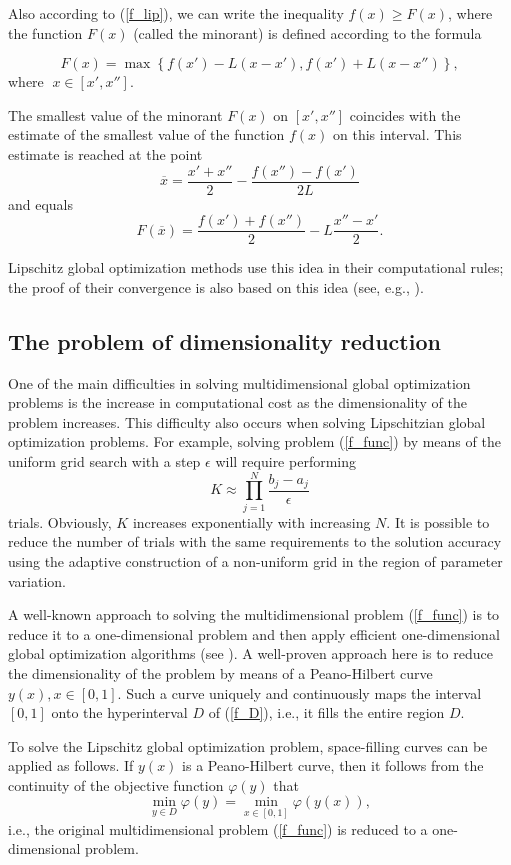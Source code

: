 \documentclass[iicol]{sn-jnl}
\theoremstyle{thmstyleone}%
\theoremstyle{thmstyletwo}%
\theoremstyle{thmstylethree}%
\begin{document}
Also according to (\ref{f_lip}), we can write the inequality $f(x) \geq F(x)$, where the function  $F(x)$ (called the minorant) is defined according to the formula

\[
F(x) = \max\left\{f(x') - L(x-x'),f(x') + L(x-x'')\right\},
\] 
where $\; x\in [x', x'']$.

The smallest value of the minorant $F(x)$ on $[x', x'']$ coincides with the estimate of the smallest value of the function $f(x)$ on this interval. This estimate is reached at the point
\[
\overline{x} = \frac{x'+x''}{2}-\frac{f(x'')-f(x')}{2L}
\] 
and equals
\[
F(\overline{x}) = \frac{f(x')+f(x'')}{2} -L \frac{x''-x'}{2}.
\]

Lipschitz global optimization methods use this idea in their computational rules; the proof of their convergence is also based on this idea (see, e.g.,
\citet{Jones2021,PaulaviciusZilinskas2014,Sergeyev2013,Evtushenko2013}).

\subsection{The problem of dimensionality reduction} 

One of the main difficulties in solving multidimensional global optimization problems is the increase in computational cost as the dimensionality of the problem increases. This difficulty also occurs when solving Lipschitzian global optimization problems. 
For example, solving problem (\ref{f_func}) by means of the uniform grid search with a step $\epsilon$ will require performing
\[
K \approx \prod_{j=1}^N{\frac{b_j-a_j}{\epsilon}}
\]
trials. Obviously, $K$ increases exponentially with increasing $N$. It is possible to reduce the number of trials with the same requirements to the solution accuracy using the adaptive construction of a non-uniform grid in the region of parameter variation. 

A well-known approach to solving the multidimensional problem (\ref{f_func}) is to reduce it to a one-dimensional problem and then apply efficient one-dimensional global optimization algorithms (see \citet{Strongin2000,Sergeyev2013}). A well-proven approach here is to reduce the dimensionality of the problem by means of a Peano-Hilbert curve $y(x), x \in [0, 1]$.  Such a curve uniquely and continuously maps the interval $[0, 1]$ onto the hyperinterval $D$ of (\ref{f_D}), i.e., it fills the entire region $D$.

To solve the Lipschitz global optimization problem, space-filling curves can be applied as follows. If $y(x)$ is a Peano-Hilbert curve, then it follows from the continuity of the objective function $\varphi(y)$ that
\[
\min_{y \in D } \varphi(y) = \min_{x \in [0,1] } \varphi(y(x)),
\]
i.e., the original multidimensional problem (\ref{f_func}) is reduced to a one-dimensional problem.
\end{document}
